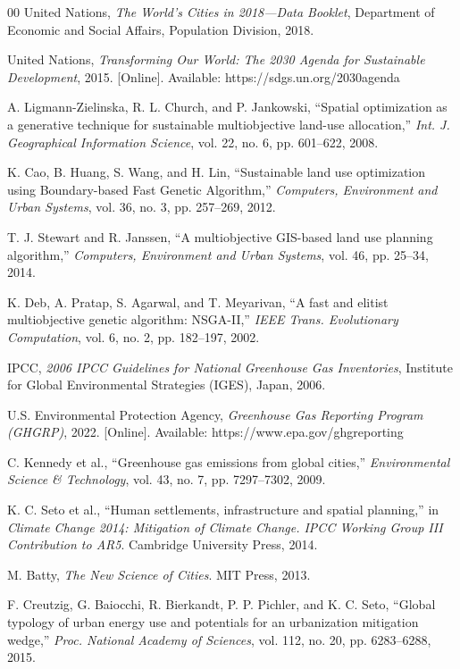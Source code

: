 \documentclass[conference]{IEEEtran}
\begin{document}
\begin{thebibliography}{00}
 United Nations, \textit{The World's Cities in 2018—Data Booklet}, Department of Economic and Social Affairs, Population Division, 2018.

 United Nations, \textit{Transforming Our World: The 2030 Agenda for Sustainable Development}, 2015. [Online]. Available: https://sdgs.un.org/2030agenda

 A. Ligmann-Zielinska, R. L. Church, and P. Jankowski, ``Spatial optimization as a generative technique for sustainable multiobjective land-use allocation,'' \textit{Int. J. Geographical Information Science}, vol. 22, no. 6, pp. 601--622, 2008.

 K. Cao, B. Huang, S. Wang, and H. Lin, ``Sustainable land use optimization using Boundary-based Fast Genetic Algorithm,'' \textit{Computers, Environment and Urban Systems}, vol. 36, no. 3, pp. 257--269, 2012.

 T. J. Stewart and R. Janssen, ``A multiobjective GIS-based land use planning algorithm,'' \textit{Computers, Environment and Urban Systems}, vol. 46, pp. 25--34, 2014.

 K. Deb, A. Pratap, S. Agarwal, and T. Meyarivan, ``A fast and elitist multiobjective genetic algorithm: NSGA-II,'' \textit{IEEE Trans. Evolutionary Computation}, vol. 6, no. 2, pp. 182--197, 2002.

 IPCC, \textit{2006 IPCC Guidelines for National Greenhouse Gas Inventories}, Institute for Global Environmental Strategies (IGES), Japan, 2006.

 U.S. Environmental Protection Agency, \textit{Greenhouse Gas Reporting Program (GHGRP)}, 2022. [Online]. Available: https://www.epa.gov/ghgreporting

 C. Kennedy et al., ``Greenhouse gas emissions from global cities,'' \textit{Environmental Science \& Technology}, vol. 43, no. 7, pp. 7297--7302, 2009.

 K. C. Seto et al., ``Human settlements, infrastructure and spatial planning,'' in \textit{Climate Change 2014: Mitigation of Climate Change. IPCC Working Group III Contribution to AR5}. Cambridge University Press, 2014.

 M. Batty, \textit{The New Science of Cities}. MIT Press, 2013.

 F. Creutzig, G. Baiocchi, R. Bierkandt, P. P. Pichler, and K. C. Seto, ``Global typology of urban energy use and potentials for an urbanization mitigation wedge,'' \textit{Proc. National Academy of Sciences}, vol. 112, no. 20, pp. 6283--6288, 2015.

\end{thebibliography}
\end{document}
